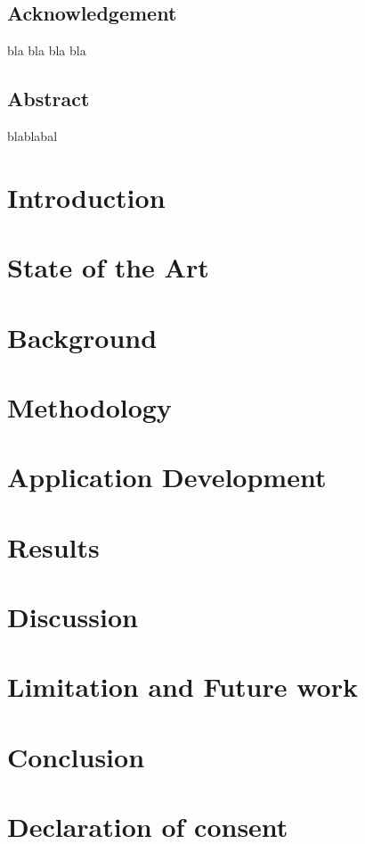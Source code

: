 \documentclass [12pt, oneside] {book}
\begin{document}

\section*{Acknowledgement}
bla bla bla bla
\newpage
\section*{Abstract}
blablabal
\tableofcontents
\listoffigures


\printglossary[type=\acronymtype, title=Abbreviations, nonumberlist]


\chapter{Introduction}

\chapter{State of the Art }

\chapter{Background}

\chapter{Methodology}

\chapter{Application Development}

\chapter{Results}

\chapter{Discussion}

\chapter{Limitation and Future work}

\chapter{Conclusion}





\appendix
\chapter{Declaration of consent}

\end{document}
